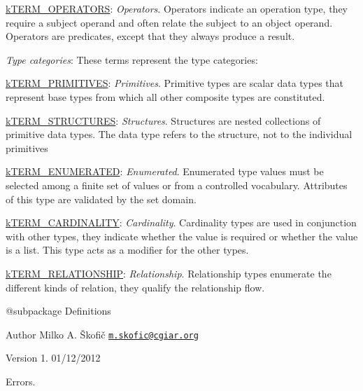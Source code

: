 \begin{DoxyItemize}
\begin{DoxyItemize}
\item {\ttfamily \hyperlink{}{k\-T\-E\-R\-M\-\_\-\-O\-P\-E\-R\-A\-T\-O\-R\-S}}\-: {\itshape Operators}. Operators indicate an operation type, they require a subject operand and often relate the subject to an object operand. Operators are predicates, except that they always produce a result. 
\end{DoxyItemize}
\item {\itshape Type categories}\-: These terms represent the type categories\-: 
\begin{DoxyItemize}
\item {\ttfamily \hyperlink{}{k\-T\-E\-R\-M\-\_\-\-P\-R\-I\-M\-I\-T\-I\-V\-E\-S}}\-: {\itshape Primitives}. Primitive types are scalar data types that represent base types from which all other composite types are constituted. 
\item {\ttfamily \hyperlink{}{k\-T\-E\-R\-M\-\_\-\-S\-T\-R\-U\-C\-T\-U\-R\-E\-S}}\-: {\itshape Structures}. Structures are nested collections of primitive data types. The data type refers to the structure, not to the individual primitives 
\item {\ttfamily \hyperlink{}{k\-T\-E\-R\-M\-\_\-\-E\-N\-U\-M\-E\-R\-A\-T\-E\-D}}\-: {\itshape Enumerated}. Enumerated type values must be selected among a finite set of values or from a controlled vocabulary. Attributes of this type are validated by the set domain. 
\item {\ttfamily \hyperlink{}{k\-T\-E\-R\-M\-\_\-\-C\-A\-R\-D\-I\-N\-A\-L\-I\-T\-Y}}\-: {\itshape Cardinality}. Cardinality types are used in conjunction with other types, they indicate whether the value is required or whether the value is a list. This type acts as a modifier for the other types. 
\item {\ttfamily \hyperlink{}{k\-T\-E\-R\-M\-\_\-\-R\-E\-L\-A\-T\-I\-O\-N\-S\-H\-I\-P}}\-: {\itshape Relationship}. Relationship types enumerate the different kinds of relation, they qualify the relationship flow. 
\end{DoxyItemize}
\end{DoxyItemize}

\begin{DoxyVerb} @subpackage        Definitions
\end{DoxyVerb}


\begin{DoxyAuthor}{Author}
Milko A. Škofič \href{mailto:m.skofic@cgiar.org}{\tt m.\-skofic@cgiar.\-org} 
\end{DoxyAuthor}
\begin{DoxyVersion}{Version}
1. 01/12/2012
\end{DoxyVersion}
Errors.

